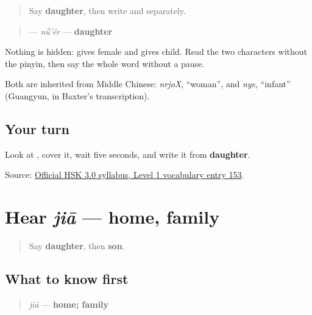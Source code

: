 \label{lesson:ZH-C12-nuer}



\begin{quote}
Say \textbf{daughter}, then write  and  separately.
\end{quote}

\begin{cousinweb}
\begin{quote}
\textbf{} — \emph{nǚ'ér} — \textbf{daughter}
\end{quote}

Nothing is hidden:  gives female and  gives child. Read the two characters without the pinyin, then say the whole word without a pause.

Both are inherited from Middle Chinese: \emph{nrjoX}, \textquotedblleft{}woman\textquotedblright{}, and \emph{nye}, \textquotedblleft{}infant\textquotedblright{} (Guangyun, in Baxter's transcription).
\end{cousinweb}

\subsection*{Your turn}
Look at \textbf{}, cover it, wait five seconds, and write it from \textbf{daughter}.

\begin{tcolorbox}[breakable,colback=teal!4,colframe=teal!35!black,title={Before you move on}]
Source: \href{https://hsk.cn-bj.ufileos.com/3.0/\%E6\%96\%B0\%E7\%89\%88HSK\%E8\%80\%83\%E8\%AF\%95\%E5\%A4\%A7\%E7\%BA\%B21219.pdf}{Official HSK 3.0 syllabus, Level 1 vocabulary entry 153}.
\end{tcolorbox}
\section[jiā]{Hear \emph{jiā} — home, family}

\label{lesson:ZH-C12-hear-jia}



\begin{quote}
Say \textbf{daughter}, then \textbf{son}.
\end{quote}

\subsection*{What to know first}
\begin{quote}
\emph{jiā} — \textbf{home; family}
\end{quote}

